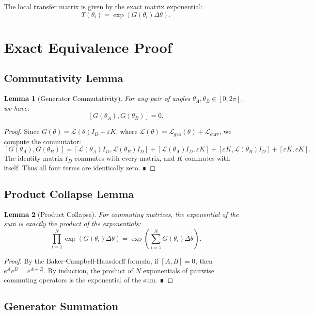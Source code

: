 \documentclass[12pt]{article}
\newtheorem{lemma}{Lemma}
\begin{document}
The local transfer matrix is given by the exact matrix exponential:
\[
T(\theta_i) = \exp\left(G(\theta_i) \Delta\theta\right).
\]

\section{Exact Equivalence Proof}

\subsection{Commutativity Lemma}

\begin{lemma}[Generator Commutativity]
For any pair of angles $\theta_A, \theta_B \in [0, 2\pi]$, we have:
\[
[G(\theta_A), G(\theta_B)] = 0.
\]
\end{lemma}

\begin{proof}
Since $G(\theta) = \mathcal{L}(\theta) I_D + \varepsilon K$, where
$\mathcal{L}(\theta) = \mathcal{L}_{\text{geo}}(\theta) + \mathcal{L}_{\text{curv}}$,
we compute the commutator:
\[
[G(\theta_A), G(\theta_B)] = [\mathcal{L}(\theta_A) I_D, \mathcal{L}(\theta_B) I_D]
+ [\mathcal{L}(\theta_A) I_D, \varepsilon K]
+ [\varepsilon K, \mathcal{L}(\theta_B) I_D] + [\varepsilon K, \varepsilon K].
\]
The identity matrix $I_D$ commutes with every matrix, and $K$ commutes with itself.
Thus all four terms are identically zero. ∎
\end{proof}

\subsection{Product Collapse Lemma}

\begin{lemma}[Product Collapse]
For commuting matrices, the exponential of the sum is exactly the product of the
exponentials:
\[
\prod_{i=1}^{N} \exp\left(G(\theta_i) \Delta\theta\right)
= \exp\left(\sum_{i=1}^{N} G(\theta_i) \Delta\theta\right).
\]
\end{lemma}

\begin{proof}
By the Baker-Campbell-Hausdorff formula, if $[A,B] = 0$, then $e^A e^B = e^{A+B}$.
By induction, the product of $N$ exponentials of pairwise commuting operators is
the exponential of the sum. ∎
\end{proof}

\subsection{Generator Summation}
\end{document}
